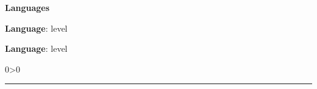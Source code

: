 \documentclass[a4paper,10pt]{article}
\newcommand{\createSection}[4][0]{
    \noindent
	\begin{minipage}{0.16\linewidth}
		\large{\textbf{#2}}
		\vspace{#3\baselineskip}
	\end{minipage}
	\hfill
	\begin{minipage}{0.79\linewidth}
		#4
		\ifnum0#1>0 { \hrule {\ } } \fi
	\end{minipage}
	\vspace{\baselineskip}
}
\begin{document}
	\createSection{Languages}{2}{
	    \large{
			\begin{minipage}{0.5\linewidth}
				\textbf{Language}: level \\
			\end{minipage}
			\begin{minipage}{0.5\linewidth}
				\textbf{Language}: level \\
			\end{minipage}
		}
	}
    \label{lastPage}
\end{document}
